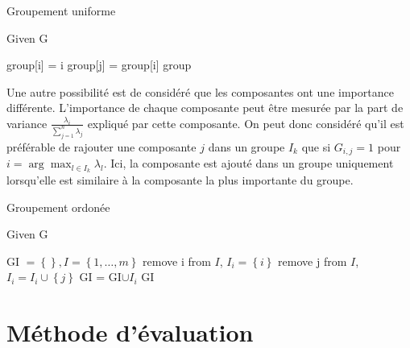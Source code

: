 \documentclass{gretsi}
\newcommand{\set}[1]{\left \{ 1, \dots, #1 \right \}}
\begin{document}
\begin{algorithm}
\caption{Groupement uniforme}\label{alg:unif}
Given G
\begin{algorithmic}[1]
\State group[i] = i
\EndFor
{}
 group[j] = group[i]
\EndIf
\EndFor
\EndFor
\State \Return group
\end{algorithmic}
\end{algorithm}

Une autre possibilité est de considéré que les composantes ont une importance différente. L'importance de chaque composante peut être mesurée par la part de variance $\frac{\lambda_i}{\sum_{j=1}^n \lambda_j}$ expliqué par cette composante. On peut donc considéré qu'il est préférable de rajouter une composante $j$ dans un groupe $I_k$ que si $G_{i, j} = 1$ pour $i = \arg\max_{l \in I_k} \lambda_l$. Ici, la composante est ajouté dans un groupe uniquement lorsqu'elle est similaire à la composante la plus importante du groupe.

\begin{algorithm}
\caption{Groupement ordonée}\label{alg:ord}
Given G
\begin{algorithmic}[1]
\State GI $= \left \{  \right \}, I = \set{m}$
\State remove i from $I$, $I_i = \left \{ i \right \}$
\State remove j from $I$, $I_i = I_i \cup \left \{ j \right \}$
\EndIf
\EndFor
\State GI = GI$ \cup I_i$
\EndFor
\State \Return GI
\end{algorithmic}
\end{algorithm}






        


\section{Méthode d'évaluation}
\label{sec:eval}
\end{document}
